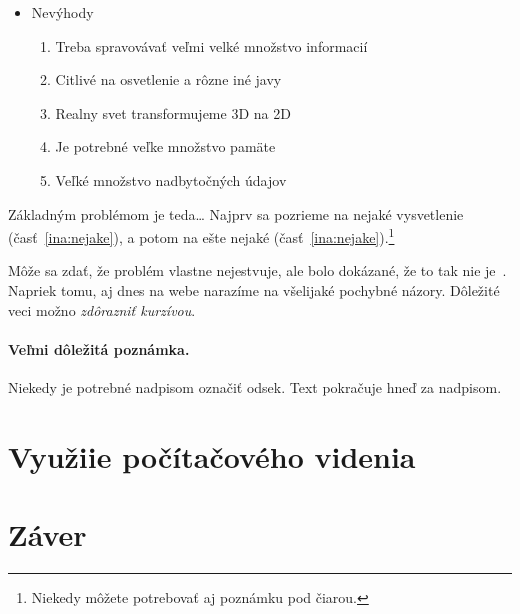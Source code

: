 \documentclass[10pt,twoside,slovak,a4paper]{coursepaper}
\begin{document}
\begin{itemize}
\item Nevýhody
	\begin{enumerate}
	\item Treba spravovávať veľmi velké množstvo informacií
	\item Citlivé na osvetlenie a rôzne iné javy
	\item Realny svet transformujeme 3D na 2D
	\item Je potrebné veľke množstvo pamäte
	\item Veľké množstvo nadbytočných údajov 
	\end{enumerate}
\end{itemize}


Základným problémom je teda\ldots{} Najprv sa pozrieme na nejaké vysvetlenie (časť~\ref{ina:nejake}), a potom na ešte nejaké (časť~\ref{ina:nejake}).\footnote{Niekedy môžete potrebovať aj poznámku pod čiarou.}

Môže sa zdať, že problém vlastne nejestvuje\cite{Coplien:MPD}, ale bolo dokázané, že to tak nie je~\cite{Czarnecki:Staged, Czarnecki:Progress}. Napriek tomu, aj dnes na webe narazíme na všelijaké pochybné názory\cite{PLP-Framework}. Dôležité veci možno \emph{zdôrazniť kurzívou}.




\paragraph{Veľmi dôležitá poznámka.}
Niekedy je potrebné nadpisom označiť odsek. Text pokračuje hneď za nadpisom.


\section{Využiie počítačového videnia} \label{zaver} 


\section{Záver} \label{zaver} %






\end{document}

